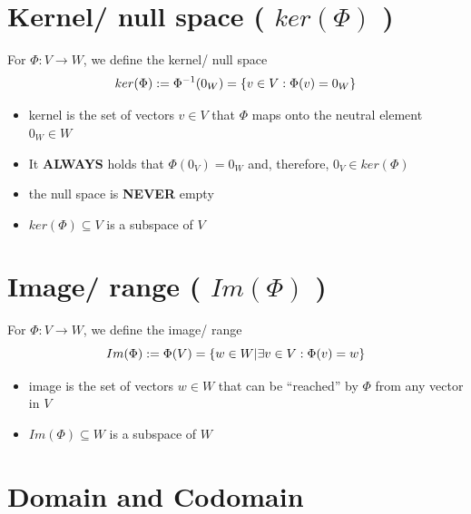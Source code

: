 


\section{Kernel/ null space ( $ker(\Phi)$ ) \cite{mfml-1}}\label{Kernel/ null space}

For $\Phi : V \to W$, we define the kernel/ null space 
\[
    \hfill
    ker(\Phi) := \Phi^{-1}(0_W) = \{v \in V : \Phi(v) = 0_W\}
    \hfill
\]

\begin{itemize}
    \item kernel is the set of vectors $v \in V$ that $\Phi$ maps onto the neutral element $0_W \in W$

    \item It \textbf{ALWAYS} holds that $\Phi(0_V) = 0_W$ and, therefore, $0_V \in ker(\Phi)$

    \item the null space is \textbf{NEVER} empty

    \item $ker(\Phi) \subseteq V$ is a subspace of $V$

    
\end{itemize}




\section{Image/ range ( $Im(\Phi)$ ) \cite{mfml-1}}\label{Image/ range}

For $\Phi : V \to W$, we define the image/ range 
\[
    \hfill
    Im(\Phi) := \Phi(V) = \{w \in W | \exists v \in V : \Phi(v) = w\}
    \hfill
\]

\begin{itemize}
    \item image is the set of vectors $w \in W$ that can be “reached” by $\Phi$ from any vector in $V$

    \item $Im(\Phi) \subseteq W$ is a subspace of $W$
\end{itemize}




\section{Domain and Codomain \cite{mfml-1}}\label{Domain and Codomain}

